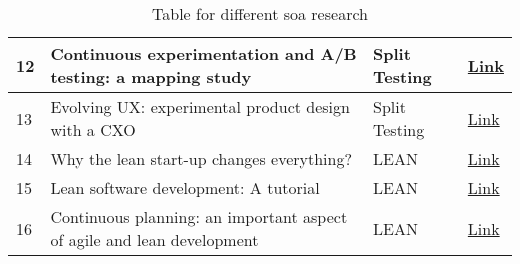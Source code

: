 \begin{table}[htbp!]
\begin{tabular}{| m{0.8em} || m{13em} | m{13em} | m{4em} | }
    \hline
    12 & Continuous experimentation and A/B testing: a mapping study & Split Testing & \href{https://dl.acm.org/doi/abs/10.1145/3194760.3194766/}{Link} \\
    \hline
    13 & Evolving UX: experimental product design with a CXO & Split Testing & \href{https://uxdesign.cc/evolving-ux-experimental-product-design-with-a-cxo-2c0865db80cc}{Link} \\
    \hline
    14 & Why the lean start-up changes everything? & LEAN & \href{https://hbr.org/2013/05/why-the-lean-start-up-changes-everything}{Link} \\
    \hline
    15 & Lean software development: A tutorial & LEAN & \href{https://ieeexplore.ieee.org/abstract/document/6226341}{Link} \\
    \hline
    16 & Continuous planning: an important aspect of agile and lean development & LEAN & \href{https://www.inderscienceonline.com/doi/abs/10.1504/IJASM.2015.070607}{Link} \\
    \hline
    \end{tabular}
    \caption[Literature review]{Table for different \ac{soa} research}
    \label{table:appendix:literature:review}
\end{table}